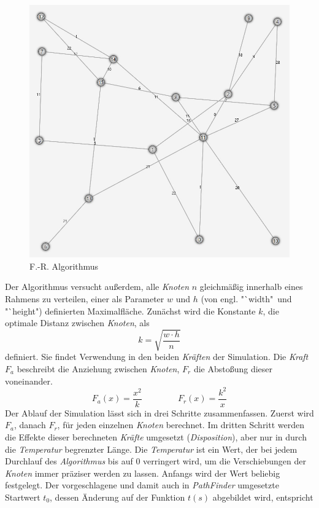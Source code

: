 \documentclass[12pt]{article}
\begin{document}
\begin{figure}
\vspace{-30pt}
\begin{center}
\includegraphics[scale=0.2]{res/graph_1.png}
\end{center}
\vspace{-30pt}
\centering
\caption{F.-R. Algorithmus}
\label{fig:graph_1}
\end{figure}
\noindent Der Algorithmus versucht außerdem, alle \textit{Knoten} $n$ gleichmäßig innerhalb eines Rahmens zu verteilen, einer als Parameter $w$ und $h$ (von engl. "`width"\ und "`height") definierten Maximalfläche. Zunächst wird die Konstante $k$, die optimale Distanz zwischen \textit{Knoten}, als
\[
k = \sqrt{\dfrac{w \cdot h}{n}} 
\]
definiert. Sie findet Verwendung in den beiden \textit{Kräften} der Simulation. Die \textit{Kraft} $F_a$ beschreibt die Anziehung zwischen \textit{Knoten}, $F_r$ die Abstoßung dieser voneinander.
\[
 F_a(x) = \dfrac{x^2}{k} \hspace{50pt} F_r(x) = \dfrac{k^2}{x}
\]
Der Ablauf der Simulation lässt sich in drei Schritte zusammenfassen. Zuerst wird $F_a$, danach $F_r$, für jeden einzelnen \textit{Knoten} berechnet. Im dritten Schritt werden die Effekte dieser berechneten \textit{Kräfte} umgesetzt (\textit{Disposition}), aber nur in durch die \textit{Temperatur} begrenzter Länge. Die \textit{Temperatur} ist ein Wert, der bei jedem Durchlauf des \textit{Algorithmus} bis auf $0$ verringert wird, um die Verschiebungen der \textit{Knoten} immer präziser werden zu lassen. Anfangs wird der Wert beliebig festgelegt. Der vorgeschlagene und damit auch in \textit{PathFinder} umgesetzte Startwert $t_0$, dessen Änderung auf der Funktion  $t(s)$ abgebildet wird, entspricht
\end{document}
